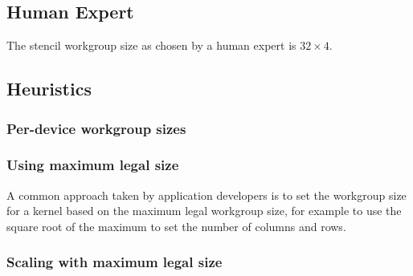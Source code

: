 


\subsection{Human Expert}


The stencil workgroup size as chosen by a human expert is
$32 \times 4$.




\subsection{Heuristics}

\subsubsection{Per-device workgroup sizes}


\subsubsection{Using maximum legal size}

A common approach taken by application developers is to set the
workgroup size for a kernel based on the maximum legal workgroup size,
for example to use the square root of the maximum to set the number of
columns and rows.


\subsubsection{Scaling with maximum legal size}



